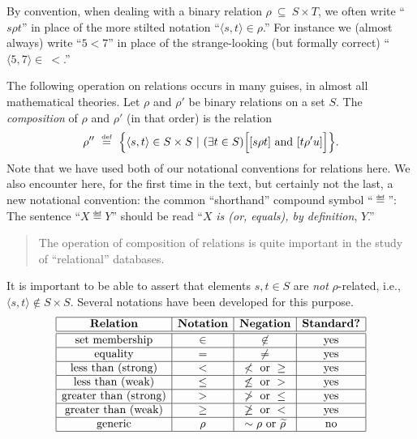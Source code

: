 By convention, when dealing with a binary relation $\rho \ \subseteq
\ S \times T$, we often write ``$s \rho t$'' in place of the more stilted notation
``$\langle s, t \rangle \in \rho$.''  For instance we (almost always)
write ``$5 < 7$'' in place of the strange-looking (but formally
correct) ``$\langle 5,7 \rangle \in \ <$.''

The following operation on relations occurs in many guises, in almost
all mathematical theories.  Let $\rho$ and $\rho'$ be binary relations
on a set $S$.  The {\it composition}
of $\rho$ and $\rho'$ (in that order) is the relation
\[ 
\rho'' \ \eqdef \ \Bigl\{ \langle s, t \rangle \in S \times S \ | \
(\exists t \in S) \Bigl[ [s \rho t] \mbox{ and } [t \rho' u] \Bigr] \Bigr\}.
\]
Note that we have used both of our notational conventions for
relations here.  We also encounter here, for the first time in the
text, but certainly not the last, a new notational convention: the
common ``shorthand'' compound symbol ``$\eqdef$'':
The sentence ``$X \eqdef Y$'' should be read ``$X$ {\em is (or, equals),
  by definition}, $Y$.''
\begin{quote}
The operation of composition of relations is quite important in the
study of ``relational'' databases.
\end{quote}

\noindent
It is important to be able to assert that elements $s, t \in S$ are
{\em not} $\rho$-related,\index{relation negation} i.e., $\langle s, t
\rangle \not\in S \times S$.  Several notations have been developed
for this purpose.
\begin{equation}
\label{eq:NOT-rho-notation}
\begin{array}{|c|c|c|c|}
\hline
\mbox{\bf Relation} & \mbox{\bf Notation} & \mbox{\bf Negation} &
\mbox{\bf Standard?} \\
\hline
\hline
\mbox{set membership} & \in & \not\in & \mbox{yes} \\
\hline
\mbox{equality}       & =   & \neq    & \mbox{yes} \\
\hline
\mbox{less than (strong)} & < & \not < \mbox{ or } \geq & \mbox{yes} \\
\hline
\mbox{less than (weak)} & \leq & \not\leq \mbox{ or } > & \mbox{yes} \\
\hline
\mbox{greater than (strong)} & > & \not > \mbox{ or } \leq & \mbox{yes} \\
\hline
\mbox{greater than (weak)} & \geq & \not\geq \mbox{ or } < & \mbox{yes} \\
\hline
\mbox{generic}  & \rho  & \sim\rho \mbox{ or } \widetilde{\rho} &
\mbox{no} \\
\hline
\end{array}
\end{equation}


